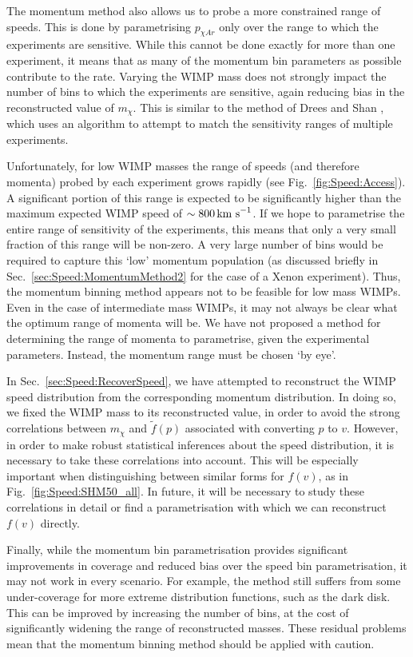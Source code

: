 The momentum method also allows us to probe a more constrained range of speeds. This is done by parametrising $p_{\chi Ar}$ only over the range to which the experiments are sensitive. While this cannot be done exactly for more than one experiment, it means that as many of the momentum bin parameters as possible contribute to the rate. Varying the WIMP mass does not strongly impact the number of bins to which the experiments are sensitive, again reducing bias in the reconstructed value of $m_\chi$. This is similar to the method of Drees and Shan \cite{Drees:2008}, which uses an algorithm to attempt to match the sensitivity ranges of multiple experiments.

Unfortunately, for low WIMP masses the range of speeds (and therefore momenta) probed by each experiment grows rapidly (see Fig.~\ref{fig:Speed:Access}). A significant portion of this range is expected to be significantly higher than the maximum expected WIMP speed of $\sim 800 \,\textrm{km s}^{-1}$. If we hope to parametrise the entire range of sensitivity of the experiments, this means that only a very small fraction of this range will be non-zero. A very large number of bins would be required to capture this `low' momentum population (as discussed briefly in Sec.~\ref{sec:Speed:MomentumMethod2} for the case of a Xenon experiment). Thus, the momentum binning method appears not to be feasible for low mass WIMPs. Even in the case of intermediate mass WIMPs, it may not always be clear what the optimum range of momenta will be. We have not proposed a method for determining the range of momenta to parametrise, given the experimental parameters. Instead, the momentum range must be chosen `by eye'. 

In Sec.~\ref{sec:Speed:RecoverSpeed}, we have attempted to reconstruct the WIMP speed distribution from the corresponding momentum distribution. In doing so, we fixed the WIMP mass to its reconstructed value, in order to avoid the strong correlations between $m_\chi$ and $\tilde{f}(p)$ associated with converting $p$ to $v$. However, in order to make robust statistical inferences about the speed distribution, it is necessary to take these correlations into account. This will be especially important when distinguishing between similar forms for $f(v)$, as in Fig.~\ref{fig:Speed:SHM50_all}. In future, it will be necessary to study these correlations in detail or find a parametrisation with which we can reconstruct $f(v)$ directly.

Finally, while the momentum bin parametrisation provides significant improvements in coverage and reduced bias over the speed bin parametrisation, it may not work in every scenario. For example, the method still suffers from some under-coverage for more extreme distribution functions, such as the dark disk. This can be improved by increasing the number of bins, at the cost of significantly widening the range of reconstructed masses. These residual problems mean that the momentum binning method should be applied with caution.

